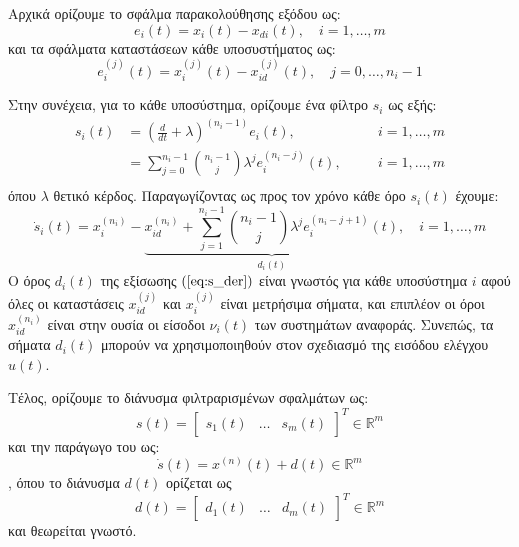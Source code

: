 Αρχικά ορίζουμε το σφάλμα παρακολούθησης εξόδου ως:
\begin{equation*}
	e_i(t) = x_i(t) - x_{di}(t), \quad i=1,\dots,m
\end{equation*}
και τα σφάλματα καταστάσεων κάθε υποσυστήματος ως:
\begin{equation*}
	e_i^{(j)}(t) = x_i^{(j)}(t) - x_{id}^{(j)}(t), 
	\quad j = 0,\dots, n_i - 1
\end{equation*}

Στην συνέχεια, για το κάθε υποσύστημα, ορίζουμε ένα φίλτρο $s_i$ ως εξής:
\begin{equation}
\begin{alignedat}{2}
	s_i(t) &= \left( 
	\frac{d}{dt} + \lambda
	\right)^{(n_i - 1)} e_i(t), \quad &&i=1,\dots,m \\
	&=\sum_{j=0}^{n_i-1}\binom{n_i-1}{j} \lambda^j e_i^{(n_i-j)}(t), \quad &&i=1,\dots,m \\
\end{alignedat}
\end{equation}
όπου $\lambda$ θετικό κέρδος. Παραγωγίζοντας ως προς τον χρόνο κάθε όρο $s_i(t)$ έχουμε:
\begin{equation}
	\dot{s}_i(t) = x_i^{(n_i)} - 
	\underbrace{x_{id}^{(n_i)} + \sum_{j=1}^{n_i-1}\binom{n_i-1}{j}
	\lambda^j e_i^{(n_i-j+1)}(t)}_{d_i(t)},
	\quad i=1,\dots,m
	\label{eq:s_der}
\end{equation}
Ο όρος $d_i(t)$ της εξίσωσης $(\ref{eq:s_der})$ είναι γνωστός για κάθε υποσύστημα $i$ αφού όλες οι καταστάσεις $x_{id}^{(j)}$ και $x_{i}^{(j)}$ είναι μετρήσιμα σήματα, και επιπλέον οι όροι $x_{id}^{(n_i)}$ είναι στην ουσία οι είσοδοι $\nu_i(t)$ των συστημάτων αναφοράς. Συνεπώς, τα σήματα $d_i(t)$ μπορούν να χρησιμοποιηθούν στον σχεδιασμό της εισόδου ελέγχου $u(t)$.

Τέλος, ορίζουμε το διάνυσμα φιλτραρισμένων σφαλμάτων ως:
\begin{equation*}
	s(t) = \begin{bmatrix}s_1(t) & \dots & s_m(t)\end{bmatrix}^T 
	\in \mathbb{R}^m
\end{equation*}
και την παράγωγο του ως:
\begin{equation}
	\dot{s}(t) = x^{(n)}(t) + d(t) \in \mathbb{R}^m
	\label{eq:filter_ders_vec}
\end{equation}
, όπου το διάνυσμα $d(t)$ ορίζεται ως
\begin{equation*}
d(t) = \begin{bmatrix}d_1(t) & \dots & d_m(t)\end{bmatrix}^T 
\in \mathbb{R}^m
\end{equation*}
και θεωρείται γνωστό.


